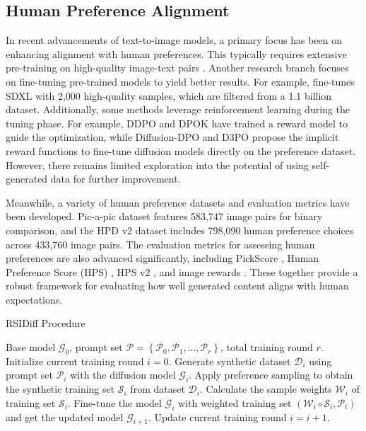 \subsection{Human Preference Alignment}
In recent advancements of text-to-image models, a primary focus has been on enhancing alignment with human preferences. 
%
This typically requires extensive pre-training on high-quality image-text pairs \cite{betker2023improving,esser2024scaling}.
%
Another research branch focuses on fine-tuning pre-trained models to yield better results.
%
For example, \cite{dai2023emu} fine-tunes SDXL \cite{podell2023sdxl} with 2,000 high-quality samples, which are filtered from a 1.1 billion dataset.
%
Additionally, some methods leverage reinforcement learning during the tuning phase. 
%
For example, DDPO \cite{black2023training} and DPOK \cite{fan2024reinforcement} have trained a reward model to guide the optimization, while Diffusion-DPO \cite{wallace2024diffusion} and D3PO \cite{yang2024using} propose the implicit reward functions to fine-tune diffusion models directly on the preference dataset.
%
However, there remains limited exploration into the potential of using self-generated data for further improvement.

Meanwhile, a variety of human preference datasets and evaluation metrics have been developed. Pic-a-pic dataset \cite{kirstain2023pick} features 583,747 image pairs for binary comparison, and the HPD v2 dataset \cite{wu2023human} includes 798,090 human preference choices across 433,760 image pairs. 
%
The evaluation metrics for assessing human preferences are also advanced significantly, including PickScore \cite{kirstain2023pick}, Human Preference Score (HPS) \cite{wu2023humanhps}, HPS v2 \cite{wu2023human}, and image rewards \cite{xu2024imagereward}. 
%
These together provide a robust framework for evaluating how well generated content aligns with human expectations.


\begin{algorithm}[tb]
   \caption{RSIDiff Procedure}
   \label{alg:rsidiff_procedure}
\begin{algorithmic}
    Base model $\mathcal{G}_0$, prompt set $\mathcal{P}=\left \{ \mathcal{P}_0, \mathcal{P}_1, ...,\mathcal{P}_r \right \}$, total training round $r$.
   \STATE Initialize current training round $i=0$.
   \REPEAT
   \STATE Generate synthetic dataset $\mathcal{D}_i$ using prompt set $\mathcal{P}_i$ with the diffusion model $\mathcal{G}_i$.
   \STATE Apply preference sampling to obtain the synthetic training set $\mathcal{S}_i$ from dataset $\mathcal{D}_i$.
   \STATE Calculate the sample weights $\mathcal{W}_i$ of training set $\mathcal{S}_i$.
   \STATE Fine-tune the model $\mathcal{G}_i$ with weighted training set $(\mathcal{W}_i\circ\mathcal{S}_i,\mathcal{P}_i)$ and get the updated model $\mathcal{G}_{i+1}$.
   \STATE Update current training round $i=i+1$.
\end{algorithmic}
\end{algorithm}